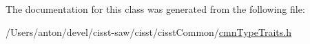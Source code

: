The documentation for this class was generated from the following file\+:\begin{DoxyCompactItemize}
\item 
/\+Users/anton/devel/cisst-\/saw/cisst/cisst\+Common/\hyperlink{cmn_type_traits_8h}{cmn\+Type\+Traits.\+h}\end{DoxyCompactItemize}
